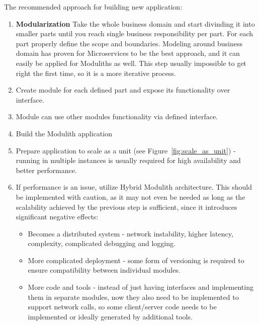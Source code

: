 The recommended approach for building new application:
\begin{enumerate}
    \item \textbf{Modularization} Take the whole business domain and start divinding it into smaller parts until you reach single business responsibility per part. For each part properly define the scope and boundaries. Modeling around business domain has proven for Microservices to be the best approach\cite{BUILDING_MS_WHAT_ARE}, and it can easily be applied for Moduliths as well. This step usually impossible to get right the first time, so it is a more iterative process.
    \item Create module for each defined part and expose its functionality over interface.
    \item Module can use other modules functionality via defined interface.
    \item Build the Modulith application
    \item Prepare application to scale as a unit (see Figure~\ref{fig:scale_as_unit}) - running in multiple instances is usually required for high availability and better performance.
    \item If performance is an issue, utilize Hybrid Modulith architecture. This should be implemented with caution, as it may not even be needed as long as the scalability achieved by the previous step is sufficient, since it introduces significant negative effects:
          \begin{itemize}
              \item Becomes a distributed system - network instability, higher latency, complexity, complicated debugging and logging.
              \item More complicated deployment - some form of versioning is required to ensure compatibility between individual modules.
              \item More code and tools - instead of just having interfaces and implementing them in separate modules, now they also need to be implemented to support network calls, so some client/server code needs to be implemented or ideally generated by additional tools.
          \end{itemize}


\end{enumerate}
